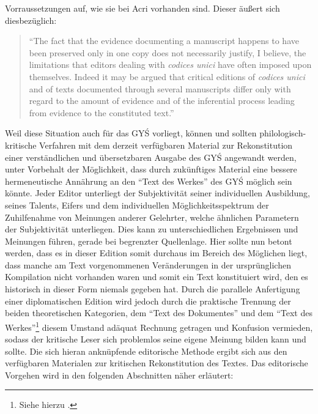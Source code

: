 \documentclass[a4paper,12pt]{article}
\begin{document}
{Vorraussetzungen auf, wie sie bei Acri vorhanden sind. Dieser äußert sich diesbezüglich: \begin{quote} ``The fact that the evidence documenting a manuscript happens to have been preserved only in one copy does not necessarily justify, I believe, the limitations that editors dealing with \textit{codices unici} have often imposed upon themselves. Indeed it may be argued that critical editions of \textit{codices unici} and of texts documented through several manuscripts differ only with regard to the amount of evidence and of the inferential process leading from evidence to the constituted text.'' \parencite[89]{acri2011dharma} \end{quote}   

Weil diese Situation auch für das GYŚ vorliegt, können und sollten philologisch-kritische Verfahren mit dem derzeit verfügbaren Material zur Rekonstitution einer verständlichen und übersetzbaren Ausgabe des GYŚ angewandt werden, unter Vorbehalt der Möglichkeit, dass durch zukünftiges Material eine bessere hermeneutische Annährung an den ``Text des Werkes'' des GYŚ möglich sein könnte. Jeder Editor unterliegt der Subjektivität seiner individuellen Ausbildung, seines Talents, Eifers und dem individuellen Möglichkeitsspektrum der Zuhilfenahme von Meinungen anderer Gelehrter, welche ähnlichen Parametern der Subjektivität unterliegen. Dies kann zu unterschiedlichen Ergebnissen und Meinungen führen, gerade bei begrenzter Quellenlage. Hier sollte nun betont werden, dass es in dieser Edition somit durchaus im Bereich des Möglichen liegt, dass manche am Text vorgenommenen Veränderungen in der ursprünglichen Kompilation nicht vorhanden waren und somit ein Text konstituiert wird, den es historisch in dieser Form niemals gegeben hat. Durch die parallele Anfertigung einer diplomatischen Edition wird jedoch durch die praktische Trennung der beiden theoretischen Kategorien, dem ``Text des Dokumentes'' und dem ``Text des Werkes''\footnote{Siehe hierzu \parencite[insbes. Kapitel 1]{tanselle1989}.} diesem Umstand adäquat Rechnung getragen und Konfusion vermieden, sodass der kritische Leser sich problemlos seine eigene Meinung bilden kann und sollte. Die sich hieran anknüpfende editorische Methode ergibt sich aus den verfügbaren Materialen zur kritischen Rekonstitution des Textes. Das editorische Vorgehen wird in den folgenden Abschnitten näher erläutert: \\

}
\end{document}
